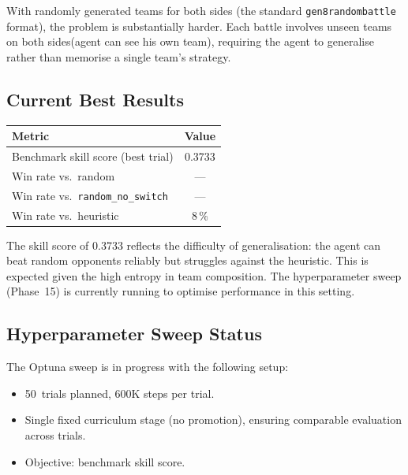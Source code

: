 With randomly generated teams for both sides (the standard
\texttt{gen8randombattle} format), the problem is substantially harder.  Each
battle involves unseen teams on both sides(agent can see his own team), requiring the agent to generalise
rather than memorise a single team's strategy. 

\subsection{Current Best Results}

\begin{center}
\small
\begin{tabularx}{0.8\textwidth}{l c}
  \toprule
  \textbf{Metric} & \textbf{Value} \\
  \midrule
  Benchmark skill score (best trial) & 0.3733 \\
  Win rate vs.\ random              & --- \\
  Win rate vs.\ \texttt{random\_no\_switch} & --- \\
  Win rate vs.\ heuristic           & 8\,\% \\
  \bottomrule
\end{tabularx}
\end{center}


The skill score of 0.3733 reflects the difficulty of generalisation: the
agent can beat random opponents reliably but struggles against the heuristic.
This is expected given the high entropy in team composition.  The
hyperparameter sweep (Phase~15) is currently running to optimise
performance in this setting.

\subsection{Hyperparameter Sweep Status}

The Optuna sweep is in progress with the following setup:
\begin{itemize}
  \item 50~trials planned, 600K steps per trial.
  \item Single fixed curriculum stage (no promotion), ensuring comparable
        evaluation across trials.
  \item Objective: benchmark skill score.
\end{itemize}

